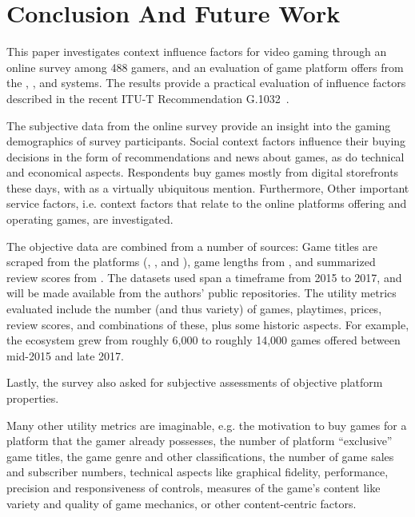 \section{Conclusion And Future Work}
\label{sec:conclusion}

This paper investigates context influence factors for video gaming
through an online survey among 488 gamers, and an evaluation of
game platform offers from the \steam, \psnow, and \gfnow systems.
The results provide a practical evaluation of influence factors
described in the recent \acrshort{ITU-T} Recommendation
G.1032~\cite{itutg1032}.

The subjective data from the online survey provide an insight into
the gaming demographics of survey participants.
Social context factors influence their buying decisions in the
form of recommendations and news about games, as do technical and
economical aspects.
Respondents buy games mostly from digital storefronts these days,
with \steam as a virtually ubiquitous mention.
Furthermore, Other important service factors, i.e. context factors
that relate to the online platforms offering and operating games,
are investigated.

The objective data are combined from a number of sources:
Game titles are scraped from the platforms (\gfnow, \psnow, and \steam),
game lengths from \hltb, and summarized review scores from
\metacritic.
The datasets used span a timeframe from 2015 to 2017, and will
be made
available from the authors' public repositories.
The utility metrics evaluated include the number (and thus variety)
of games, playtimes, prices, review scores, and combinations of these,
plus some historic aspects.
For example, the \steam ecosystem grew from roughly 6,000 to roughly
14,000 games offered between mid-2015 and late 2017.

Lastly, the survey also asked for subjective assessments of objective
platform properties.






Many other utility metrics are imaginable, e.g.
the motivation to buy games for a platform that the gamer already
possesses,
the number of platform ``exclusive'' game titles,
the game genre and other classifications,
the number of game sales and subscriber numbers,
technical aspects like graphical fidelity, performance, precision
and responsiveness of controls,
measures of the game's content like variety and quality of game mechanics,
or other content-centric factors.

